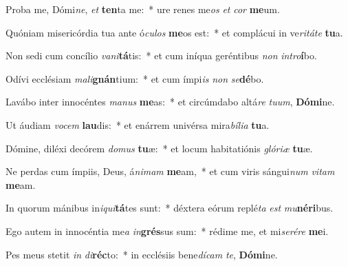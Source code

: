 \item Proba me, Dómi\textit{ne}, \textit{et} \textbf{ten}ta me:~* ure renes me\textit{os} \textit{et} \textit{cor} \textbf{me}um.
\item Quóniam misericórdia tua ante ó\textit{cu}\textit{los} \textbf{me}os est:~* et complácui in ve\textit{ri}\textit{tá}\textit{te} \textbf{tu}a.
\item Non sedi cum concílio \textit{va}\textit{ni}\textbf{tá}tis:~* et cum iníqua geréntibus \textit{non} \textit{in}\textit{tro}\textbf{í}bo.
\item Odívi ecclésiam \textit{ma}\textit{li}\textbf{gnán}tium:~* et cum ímpi\textit{is} \textit{non} \textit{se}\textbf{dé}bo.
\item Lavábo inter innocéntes \textit{ma}\textit{nus} \textbf{me}as:~* et circúmdabo altá\textit{re} \textit{tu}\textit{um}, \textbf{Dó}\textbf{mi}ne.
\item Ut áudiam \textit{vo}\textit{cem} \textbf{lau}dis:~* et enárrem univérsa mira\textit{bí}\textit{li}\textit{a} \textbf{tu}a.
\item Dómine, diléxi decórem \textit{do}\textit{mus} \textbf{tu}æ:~* et locum habitatiónis \textit{gló}\textit{ri}\textit{æ} \textbf{tu}æ.
\item Ne perdas cum ímpiis, Deus, á\textit{ni}\textit{mam} \textbf{me}am,~* et cum viris sángui\textit{num} \textit{vi}\textit{tam} \textbf{me}am.
\item In quorum mánibus in\textit{i}\textit{qui}\textbf{tá}tes sunt:~* déxtera eórum replé\textit{ta} \textit{est} \textit{mu}\textbf{né}\textbf{ri}bus.
\item Ego autem in innocéntia me\textit{a} \textit{in}\textbf{grés}sus sum:~* rédime me, et mi\textit{se}\textit{ré}\textit{re} \textbf{me}i.
\item Pes meus stetit \textit{in} \textit{di}\textbf{réc}to:~* in ecclésiis bene\textit{dí}\textit{cam} \textit{te}, \textbf{Dó}\textbf{mi}ne.
